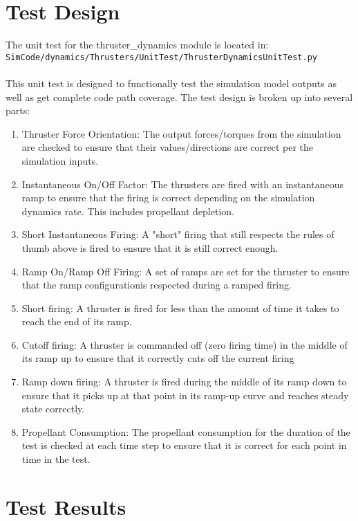 \documentclass[]{BasiliskReportMemo}
\begin{document}
\section{Test Design}
The unit test for the thruster\_dynamics module is located in:\\

\noindent
{\tt SimCode/dynamics/Thrusters/UnitTest/ThrusterDynamicsUnitTest.py} \\
\\

\noindent This unit test is designed to functionally test the simulation model 
outputs as well as get complete code path coverage.  The test design is broken 
up into several parts:\\
\begin{enumerate}
\item{Thruster Force Orientation: The output forces/torques from the simulation 
  are checked to ensure that their values/directions are correct per the 
  simulation inputs.}
\item{Instantaneous On/Off Factor: The thrusters are fired with an 
  instantaneous ramp to ensure that the firing is correct depending on the 
  simulation dynamics rate.  This includes propellant depletion.}
\item{Short Instantaneous Firing: A "short" firing that still respects the 
  rules of thumb above is fired to ensure that it is still correct enough.}
\item{Ramp On/Ramp Off Firing: A set of ramps are set for the thruster to ensure 
  that the ramp configurationis respected during a ramped firing.}
\item{Short firing: A thruster is fired for less than the amount of time it 
   takes to reach the end of its ramp.}
\item{Cutoff firing: A thruster is commanded off (zero firing time) in the middle 
   of its ramp up to ensure that it correctly cuts off the current firing}
\item{Ramp down firing: A thruster is fired during the middle of its ramp down 
   to ensure that it picks up at that point in its ramp-up curve and reaches 
   steady state correctly.}
\item{Propellant Consumption: The propellant consumption for the duration of the 
    test is checked at each time step to ensure that it is correct for each 
    point in time in the test.}
\end{enumerate}


\section{Test Results}
\end{document}
